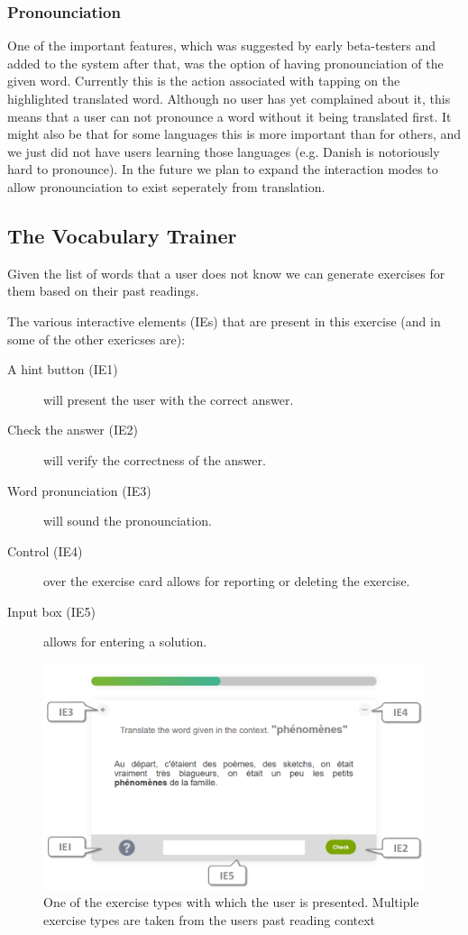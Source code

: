 \subsubsection{Pronounciation}
One of the important features, which was suggested by early beta-testers and added to the system after that, was the option of having pronounciation of the given word. Currently this is the action associated with tapping on the highlighted translated word. Although no user has yet complained about it, this means that a user can not pronounce a word without it being translated first. It might also be that for some languages this is more important than for others, and we just did not have users learning those languages (e.g. Danish is notoriously hard to pronounce). In the future we plan to expand the interaction modes to allow pronounciation to exist seperately from translation.

\subsection{The Vocabulary Trainer}

Given the list of words that a user does not know we can generate exercises for them based on their past readings.

The various interactive elements (IEs) that are present in this exercise (and in some of the other exericses are): 

\begin{description}
	\item [A hint button (IE1)] will present the user with the correct answer.
	\item [Check the answer (IE2)] will verify the correctness of the answer.
	\item [Word pronunciation (IE3)] will sound the pronounciation.
	\item [Control (IE4)] over the exercise card allows for reporting or deleting the exercise.
	\item [Input box (IE5)] allows for entering a solution.
\end{description}

\begin{figure}[h!]
\centering
  \includegraphics[width=\columnwidth]{figures/exercise_translate}
  \caption{One of the exercise types with which the user is presented. Multiple exercise types are taken from the users past reading context}
\end{figure}

